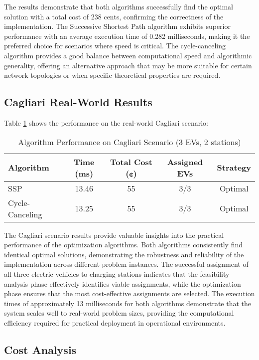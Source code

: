 \documentclass[12pt,a4paper]{article}
\begin{document}
The results demonstrate that both algorithms successfully find the optimal solution with a total cost of 238 cents, confirming the correctness of the implementation. The Successive Shortest Path algorithm exhibits superior performance with an average execution time of 0.282 milliseconds, making it the preferred choice for scenarios where speed is critical. The cycle-canceling algorithm provides a good balance between computational speed and algorithmic generality, offering an alternative approach that may be more suitable for certain network topologies or when specific theoretical properties are required.

\subsection{Cagliari Real-World Results}

Table \ref{tab:cagliari_results} shows the performance on the real-world Cagliari scenario:

\begin{table}[H]
\centering
\caption{Algorithm Performance on Cagliari Scenario (3 EVs, 2 stations)}
\label{tab:cagliari_results}
\begin{tabular}{@{}lcccc@{}}
\toprule
\textbf{Algorithm} & \textbf{Time (ms)} & \textbf{Total Cost (¢)} & \textbf{Assigned EVs} & \textbf{Strategy} \\
\midrule
SSP & 13.46 & 55 & 3/3 & Optimal \\
Cycle-Canceling & 13.25 & 55 & 3/3 & Optimal \\
\bottomrule
\end{tabular}
\end{table}

The Cagliari scenario results provide valuable insights into the practical performance of the optimization algorithms. Both algorithms consistently find identical optimal solutions, demonstrating the robustness and reliability of the implementation across different problem instances. The successful assignment of all three electric vehicles to charging stations indicates that the feasibility analysis phase effectively identifies viable assignments, while the optimization phase ensures that the most cost-effective assignments are selected. The execution times of approximately 13 milliseconds for both algorithms demonstrate that the system scales well to real-world problem sizes, providing the computational efficiency required for practical deployment in operational environments.

\subsection{Cost Analysis}
\end{document}
